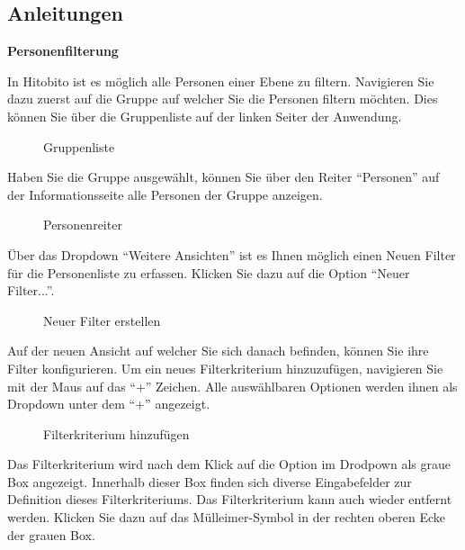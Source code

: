 \subsection{Anleitungen}
\textbf{Personenfilterung}

In Hitobito ist es möglich alle Personen einer Ebene zu filtern. Navigieren Sie dazu zuerst auf die Gruppe auf welcher Sie die Personen filtern möchten.
Dies können Sie über die Gruppenliste auf der linken Seiter der Anwendung.

\begin{figure}[h]
   \centering
   \caption{Gruppenliste}
\end{figure}

\newpage

Haben Sie die Gruppe ausgewählt, können Sie über den Reiter ``Personen'' auf der Informationsseite alle Personen
der Gruppe anzeigen. 

\begin{figure}[h]
   \centering
   \caption{Personenreiter}
\end{figure}

Über das Dropdown ``Weitere Ansichten'' ist es Ihnen möglich einen Neuen Filter für die Personenliste zu erfassen.
Klicken Sie dazu auf die Option ``Neuer Filter...''.

\begin{figure}[h]
   \centering
   \caption{Neuer Filter erstellen}
\end{figure}

Auf der neuen Ansicht auf welcher Sie sich danach befinden, können Sie ihre Filter konfigurieren.
Um ein neues Filterkriterium hinzuzufügen, navigieren Sie mit der Maus auf das ``+'' Zeichen. Alle auswählbaren
Optionen werden ihnen als Dropdown unter dem ``+'' angezeigt. 

\begin{figure}[h]
   \centering
   \caption{Filterkriterium hinzufügen}
\end{figure}

\newpage

Das Filterkriterium wird nach dem Klick auf die Option im Drodpown als graue Box angezeigt.
Innerhalb dieser Box finden sich diverse Eingabefelder zur Definition dieses Filterkriteriums. 
Das Filterkriterium kann auch wieder entfernt werden. Klicken Sie dazu auf das Mülleimer-Symbol in 
der rechten oberen Ecke der grauen Box.

